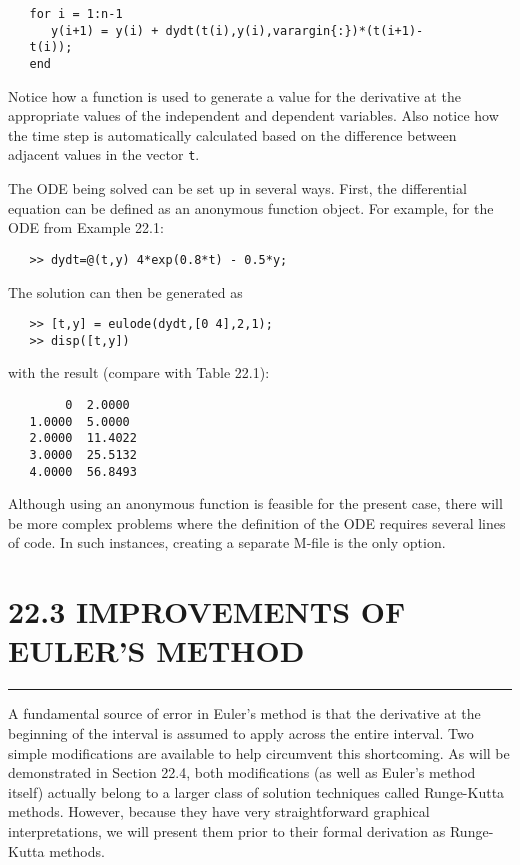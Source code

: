 \documentclass[../main.tex]{subfiles}
\begin{document}
\begin{verbatim}
   for i = 1:n-1 
      y(i+1) = y(i) + dydt(t(i),y(i),varargin{:})*(t(i+1)-
   t(i));
   end
\end{verbatim}
Notice how a function is used to generate a value for the derivative at the appropriate values of the independent and dependent variables. Also notice how the time step is automatically calculated based on the difference between adjacent values in the vector \texttt{t}.

The ODE being solved can be set up in several ways. First, the differential equation can
be defined as an anonymous function object. For example, for the ODE from Example 22.1:

\begin{verbatim}
   >> dydt=@(t,y) 4*exp(0.8*t) - 0.5*y;
\end{verbatim}
The solution can then be generated as

\begin{verbatim}
   >> [t,y] = eulode(dydt,[0 4],2,1);
   >> disp([t,y])
\end{verbatim}
with the result (compare with Table 22.1):

\begin{verbatim}
        0  2.0000
   1.0000  5.0000
   2.0000  11.4022
   3.0000  25.5132
   4.0000  56.8493
\end{verbatim}

Although using an anonymous function is feasible for the present case, there will be
more complex problems where the definition of the ODE requires several lines of code. In
such instances, creating a separate M-file is the only option.

\vspace{0,3in}
\section{22.3 IMPROVEMENTS OF EULER'S METHOD}
\vspace{0,1in}
\hrule
\vspace{0,1in}

A fundamental source of error in Euler's method is that the derivative at the beginning of
the interval is assumed to apply across the entire interval. Two simple modifications are
available to help circumvent this shortcoming. As will be demonstrated in Section 22.4,
both modifications (as well as Euler's method itself) actually belong to a larger class of solution techniques called Runge-Kutta methods. However, because they have very straightforward graphical interpretations, we will present them prior to their formal derivation as
Runge-Kutta methods.
\end{document}
